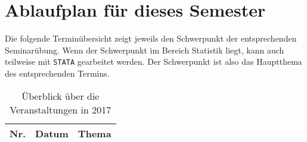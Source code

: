 \documentclass[a4paper,fontsize=14pt]{article}
\begin{document}
\section{Ablaufplan für dieses Semester}
Die folgende Terminübersicht zeigt jeweils den Schwerpunkt der entsprechenden Seminarübung. Wenn der Schwerpunkt im Bereich
Statistik liegt, kann auch teilweise mit \texttt{STATA} gearbeitet werden. Der Schwerpunkt ist also das Hauptthema des entsprechenden
Termins.
\begin{table}[h]
\begin{center}
\caption{Überblick über die Veranstaltungen in 2017}
  \begin{tabular}{|c|c|c|}
    \hline
    Nr. & Datum & Thema \\ \hline
   

\end{tabular}
\end{center}
\end{table}
\end{document}
